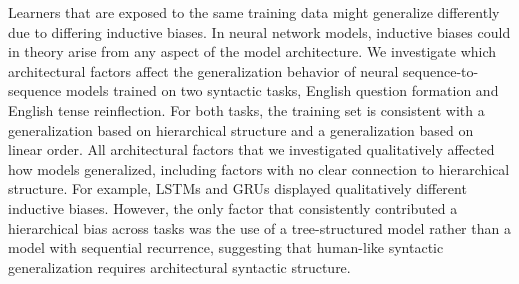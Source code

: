 Learners that are exposed to the same training data might generalize differently due to differing inductive biases. In neural network models, inductive biases could in theory arise from any aspect of the model architecture. We investigate which architectural factors affect the generalization behavior of neural sequence-to-sequence models trained on two syntactic tasks, English question formation and English tense reinflection. For both tasks, the training set is consistent with a generalization based on hierarchical structure and a generalization based on linear order. All architectural factors that we investigated qualitatively affected how models generalized, including factors with no clear connection to hierarchical structure. For example, LSTMs and GRUs displayed qualitatively different inductive biases. However, the only factor that consistently contributed a hierarchical bias across tasks was the use of a tree-structured model rather than a model with sequential recurrence, suggesting that human-like syntactic generalization requires architectural syntactic structure.